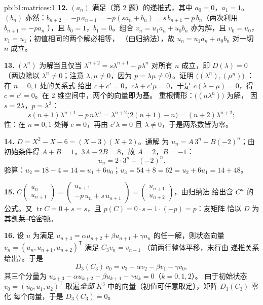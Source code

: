 \begin{solution}{pb:b1:matrices:1}
\textbf{12.} $(a_n)$ 满足（第 2 题）的递推式，其中 $a_0
= 0$，$a_1 = 1$。$(b_n)$ 亦然：$b_{n+2} = -p\,a_{n+1} =
-p(s a_n + b_n) = s\,b_{n+1} - p\,b_n$（两次利用 $b_{n+1} = -pa_n$
），且 $b_0 = 1$，$b_1 = 0$。组合 $v_n =
u_1 a_n + u_0 b_n$ 亦为解，且 $v_0 = u_0$，$v_1 =
u_1$；初值相同的两个解必相等，
（由归纳法），故 $u_n = u_1 a_n + u_0 b_n$ 对一切 $n$ 成立。

\textbf{13.} $(\lambda^n)$ 为解当且仅当 $\lambda^{n+2} =
s\lambda^{n+1} - p\lambda^n$ 对所有 $n$ 成立，即 $D(\lambda) = 0$
（两边除以 $\lambda^n \neq 0$；注意 $\lambda, \mu \neq
0$，因为 $p = \lambda\mu \neq 0$）。证明
$\bigl((\lambda^n), (\mu^n)\bigr)$ ：在 $n = 0, 1$ 处的关系式
给出 $c + c' = 0$，$c\lambda + c'\mu = 0$，于是 $c(\lambda - \mu)
= 0$，得 $c = c' = 0$。在 $2$ 维空间中，两个的向量即为基。
重根情形：$\bigl((n\lambda^n)\bigr)$ 为解，
因 $s = 2\lambda$，$p = \lambda^2$：
\[
s(n+1)\lambda^{n+1} - p\,n\lambda^n
= \lambda^{n+2}\bigl(2(n+1) - n\bigr) = (n+2)\lambda^{n+2} ;
\]
性：在 $n = 0, 1$ 处得 $c = 0$，再由 $c'\lambda = 0$
且 $\lambda \neq 0$，于是两系数皆为零。

\textbf{14.} $D = X^2 - X - 6 = (X - 3)(X + 2)$。通解
为 $u_n = A\,3^n + B(-2)^n$；由初始条件得
$A + B = 1$，$3A - 2B = 8$，故 $A = 2$，$B = -1$：
\[
u_n = 2\cdot 3^n - (-2)^n .
\]
验算：$u_2 = 18 - 4 = 14 = u_1 + 6u_0$；$u_3 = 54 + 8 = 62 =
u_2 + 6u_1 = 14 + 48$。

\textbf{15.} $C\begin{pmatrix} u_n\\ u_{n+1}\end{pmatrix} =
\begin{pmatrix} u_{n+1}\\ -p\,u_n + s\,u_{n+1}\end{pmatrix} =
\begin{pmatrix} u_{n+1}\\ u_{n+2}\end{pmatrix}$，由归纳法
给出含 $C^n$ 的公式。又 $\operatorname{tr} C = 0
+ s = s$，且 $p(C) = 0\cdot s - 1\cdot(-p) = p$：友矩阵
恰以 $D$ 为其凯莱--哈密顿。

\textbf{16.} 设 $u$ 为满足 $u_{n+3} = \alpha u_{n+2} +
\beta u_{n+1} + \gamma u_n$ 的任一解，则状态向量 $v_n = (u_n,
u_{n+1}, u_{n+2})^{\mathsf T}$ 满足 $C_3 v_n = v_{n+1}$
（前两行整体平移，末行由
递推关系给出）。于是
\[
D_3(C_3)\,v_0 = v_3 - \alpha v_2 - \beta v_1 - \gamma v_0 ,
\]
其三个分量为 $u_{k+3} - \alpha u_{k+2} - \beta
u_{k+1} - \gamma u_k = 0$（$k = 0, 1, 2$）。
由于初始状态 $v_0 = (u_0, u_1, u_2)^{\mathsf T}$ 取遍\emph{全部}
$K^3$ 中的向量（初值可任意取定），矩阵 $D_3(C_3)$ 零化
每个向量，于是 $D_3(C_3) = 0$。


\end{solution}
